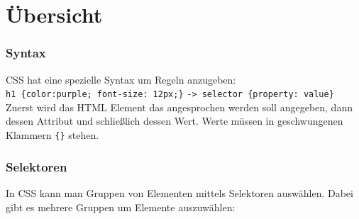 \documentclass{article}
\begin{document}
	\section{Übersicht}
	\subsubsection{Syntax}
	CSS hat eine spezielle Syntax um Regeln anzugeben: \\
	\texttt{h1 \{color:purple; font-size: 12px;\}} \texttt{-> selector \{property: value\}} \\
	Zuerst wird das HTML Element das angesprochen werden soll angegeben, dann dessen Attribut und schließlich dessen Wert. Werte müssen in geschwungenen Klammern \texttt{\{\}} stehen. \\
	\subsubsection{Selektoren}
	In CSS kann man Gruppen von Elementen mittels Selektoren auswählen. Dabei gibt es mehrere Gruppen um Elemente auszuwählen:
\end{document}
